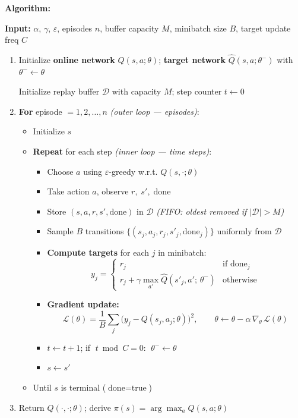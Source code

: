 \documentclass[11pt]{article}
\providecommand{\tightlist}{%
      \setlength{\itemsep}{0pt}\setlength{\parskip}{0pt}}
\begin{document}
    \textbf{Algorithm:}

\textbf{Input:} \(\alpha\), \(\gamma\), \(\varepsilon\), episodes \(n\),
buffer capacity \(M\), minibatch size \(B\), target update freq \(C\)

\begin{enumerate}
\def\labelenumi{\arabic{enumi}.}
\item
  Initialize \textbf{online network} \(Q(s,a;\theta)\); \textbf{target
  network} \(\hat{Q}(s,a;\theta^-)\) with \(\theta^- \leftarrow \theta\)

  Initialize replay buffer \(\mathcal{D}\) with capacity \(M\); step
  counter \(t \leftarrow 0\)
\item
  \textbf{For} episode \(= 1, 2, \ldots, n\) \emph{(outer loop ---
  episodes)}:

  \begin{itemize}
  \tightlist
  \item
    Initialize \(s\)
  \item
    \textbf{Repeat} for each step \emph{(inner loop --- time steps)}:

    \begin{itemize}
    \tightlist
    \item
      Choose \(a\) using \(\varepsilon\)-greedy w.r.t.
      \(Q(s,\cdot;\theta)\)
    \item
      Take action \(a\), observe \(r,\; s',\; \text{done}\)
    \item
      Store \((s, a, r, s', \text{done})\) in \(\mathcal{D}\)
      \emph{(FIFO: oldest removed if \(|\mathcal{D}| > M\))}
    \item
      Sample \(B\) transitions
      \(\{(s_j, a_j, r_j, s'_j, \text{done}_j)\}\) uniformly from
      \(\mathcal{D}\)
    \item
      \textbf{Compute targets} for each \(j\) in minibatch:
      \[y_j = \begin{cases} r_j & \text{if } \text{done}_j \\ r_j + \gamma \max_{a'} \hat{Q}(s'_j, a';\, \theta^-) & \text{otherwise} \end{cases}\]
    \item
      \textbf{Gradient update:}
      \[\mathcal{L}(\theta) = \frac{1}{B}\sum_j \bigl(y_j - Q(s_j, a_j;\theta)\bigr)^2, \qquad \theta \leftarrow \theta - \alpha\,\nabla_\theta\,\mathcal{L}(\theta)\]
    \item
      \(t \leftarrow t+1\); if \(\;t \bmod C = 0\):
      \(\;\theta^- \leftarrow \theta\)
    \item
      \(s \leftarrow s'\)
    \end{itemize}
  \item
    Until \(s\) is terminal (\(\text{done} = \text{true}\))
  \end{itemize}
\item
  Return \(Q(\cdot,\cdot;\theta)\); derive
  \(\pi(s) = \arg\max_a Q(s,a;\theta)\)
\end{enumerate}
\end{document}
